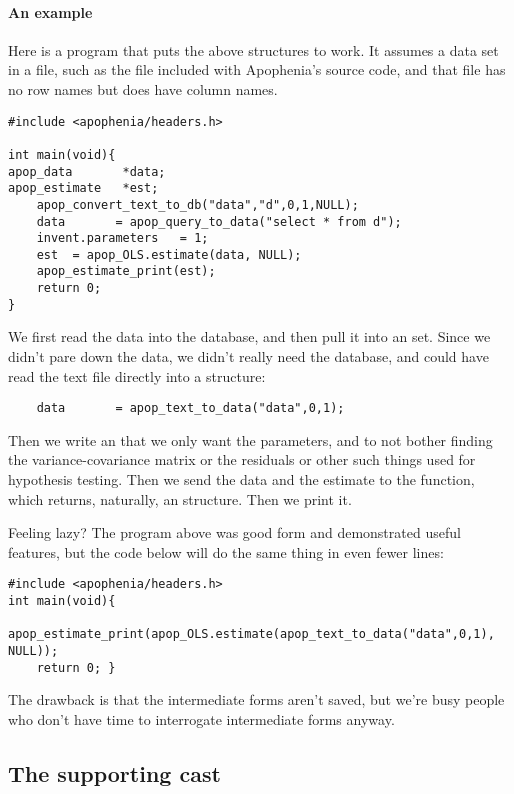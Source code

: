 \paragraph{An example}
Here is a program that puts the above structures to work.  It assumes a
data set in a file, such as the  file included with
Apophenia's source code, and that file has no row names but does have
column names.
\begin{lstlisting}
#include <apophenia/headers.h>

int main(void){
apop_data       *data;
apop_estimate   *est;
    apop_convert_text_to_db("data","d",0,1,NULL);
    data       = apop_query_to_data("select * from d");
    invent.parameters   = 1;
    est  = apop_OLS.estimate(data, NULL);
    apop_estimate_print(est);
    return 0;
}
\end{lstlisting}

We first read the data into the database, and then pull it into an  set. Since we didn't pare down the data, we didn't really
need the database, and could have read the text file directly into a
 structure:
\begin{lstlisting}
    data       = apop_text_to_data("data",0,1);
\end{lstlisting}
Then we write an  that we only want the
parameters, and to not bother finding the variance-covariance matrix or
the residuals or other such things used for hypothesis testing. Then we
send the data and the estimate to the 
function, which returns, naturally, an 
structure. Then we print it.

Feeling lazy? The program above was good form and demonstrated useful
features, but the code below will do the same thing in even fewer lines:

\begin{lstlisting}
#include <apophenia/headers.h>
int main(void){
    apop_estimate_print(apop_OLS.estimate(apop_text_to_data("data",0,1), NULL));
    return 0; }
\end{lstlisting}

The drawback is that the intermediate forms aren't saved, but we're busy
people who don't have time to interrogate intermediate forms anyway.

\subsection{The supporting cast}
